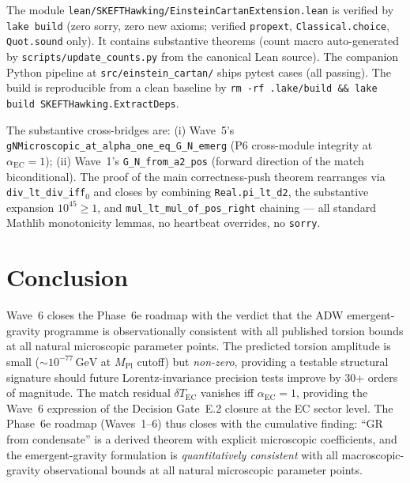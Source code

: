 \documentclass[twocolumn]{revtex4-2}
\newcommand{\MPl}{M_{\mathrm{Pl}}}
\newcommand{\aEC}{\alpha_{\mathrm{EC}}}
\newcommand{\TEC}{T_{\mathrm{EC}}}
\begin{document}
The module
\texttt{lean/SKEFTHawking/EinsteinCartanExtension.lean}
is verified by \texttt{lake build} (zero sorry, zero new
axioms; verified \texttt{propext}, \texttt{Classical.choice},
\texttt{Quot.sound} only). It contains
\einsteinCartanExtensionThms{} substantive theorems (count macro
auto-generated by \texttt{scripts/update\_counts.py} from the
canonical Lean source). The companion Python pipeline at
\texttt{src/einstein\_cartan/} ships
\einsteinCartanExtensionTests{} pytest cases (all passing). The
build is reproducible from a clean baseline by
\texttt{rm -rf .lake/build \&\& lake build SKEFTHawking.ExtractDeps}.

The substantive cross-bridges are: (i) Wave~5's
\texttt{gNMicroscopic\_at\_alpha\_one\_eq\_G\_N\_emerg} (P6
cross-module integrity at $\aEC = 1$); (ii) Wave~1's
\texttt{G\_N\_from\_a2\_pos} (forward direction of the match
biconditional). The proof of the main correctness-push theorem
rearranges via \texttt{div\_lt\_div\_iff$_{0}$} and closes by
combining \texttt{Real.pi\_lt\_d2}, the substantive expansion
$10^{45} \geq 1$, and \texttt{mul\_lt\_mul\_of\_pos\_right}
chaining --- all standard Mathlib monotonicity lemmas, no
heartbeat overrides, no \texttt{sorry}.

\section{Conclusion}

Wave~6 closes the Phase~6e roadmap with the verdict that the ADW
emergent-gravity programme is observationally consistent with all
published torsion bounds at all natural microscopic parameter
points. The predicted torsion amplitude is small ($\sim 10^{-77}\,
\mathrm{GeV}$ at $\MPl$ cutoff) but \emph{non-zero}, providing a
testable structural signature should future Lorentz-invariance
precision tests improve by 30+ orders of magnitude. The match
residual $\delta\TEC$ vanishes iff $\aEC = 1$, providing the Wave~6
expression of the Decision Gate~E.2 closure at the EC sector level.
The Phase~6e roadmap (Waves~1--6) thus closes with the cumulative
finding: ``GR from condensate'' is a derived theorem with explicit
microscopic coefficients, and the emergent-gravity formulation is
\emph{quantitatively consistent} with all macroscopic-gravity
observational bounds at all natural microscopic parameter points.
\end{document}
